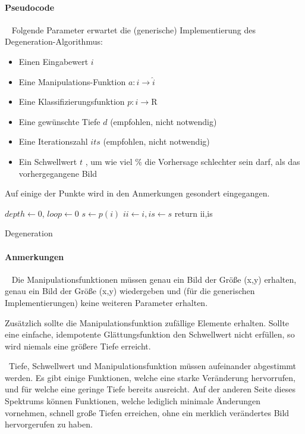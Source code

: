 \paragraph{Pseudocode} ~\newline 
Folgende Parameter erwartet die (generische) Implementierung des Degeneration-Algorithmus: 
\begin{itemize}
	\item Einen Eingabewert $i$
	\item Eine Manipulations-Funktion $a : i \rightarrow \hat{i}$
	\item Eine Klassifizierungsfunktion $p : i \rightarrow \mathrm{R}$
	\item Eine gewünschte Tiefe $d$ (empfohlen, nicht notwendig)
	\item Eine Iterationszahl $its$ (empfohlen, nicht notwendig)
	\item Ein Schwellwert $t$ , um wie viel \% die Vorhersage schlechter sein darf, als das vorhergegangene Bild 
\end{itemize}
Auf einige der Punkte wird in den Anmerkungen gesondert eingegangen. ~\newline
\IncMargin{1em}
\begin{algorithm}
	\BlankLine
	$depth  \leftarrow 0$, $loop \leftarrow0$ \;
	$s \leftarrow p(i)$\;
	$ii \leftarrow i , is \leftarrow s$ \;
	return ii,is\;
	
	\caption{Degeneration}\label{algo_degen}
\end{algorithm}\DecMargin{1em}
\newpage
\paragraph{Anmerkungen}~\newline 
Die Manipulationsfunktionen müssen genau ein Bild der Größe (x,y) erhalten, genau ein Bild der Größe (x,y) wiedergeben und (für die generischen Implementierungen) keine weiteren Parameter erhalten. 

Zusätzlich sollte die Manipulationsfunktion zufällige Elemente erhalten. Sollte eine einfache, idempotente Glättungsfunktion den Schwellwert nicht erfüllen, so wird niemals eine größere Tiefe erreicht.  

~\newline Tiefe, Schwellwert und Manipulationsfunktion müssen aufeinander abgestimmt werden. Es gibt einige Funktionen, welche eine starke Veränderung hervorrufen, und für welche eine geringe Tiefe bereits ausreicht. Auf der anderen Seite dieses Spektrums können Funktionen, welche lediglich minimale Änderungen vornehmen, schnell große Tiefen erreichen, ohne ein merklich verändertes Bild hervorgerufen zu haben. 

